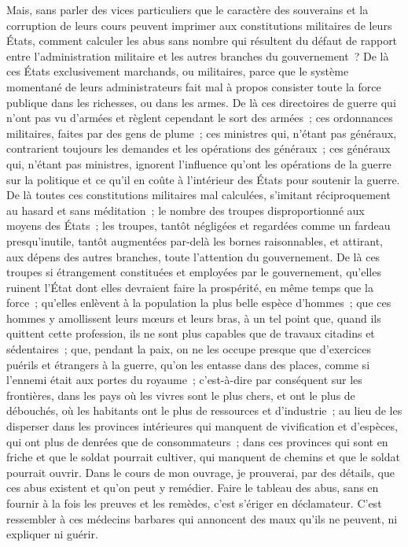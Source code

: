 \documentclass[french,twoside]{book} %
\begin{document}
Mais, sans parler des vices particuliers que le caractère des souverains et la corruption de leurs cours peuvent imprimer aux constitutions militaires de leurs États, comment calculer les abus sans nombre qui résultent du défaut de rapport entre l’administration militaire et les autres branches du gouvernement ? De là ces États exclusivement marchands, ou militaires, parce que le système momentané de leurs administrateurs fait mal à propos consister toute la force publique dans les richesses, ou dans les armes. De là ces directoires de guerre qui n’ont pas vu d’armées et règlent cependant le sort des armées ; ces ordonnances militaires, faites par des gens de plume ; ces ministres qui, n’étant pas généraux, contrarient toujours les demandes et les opérations des généraux ; ces généraux qui, n’étant pas ministres, ignorent l’influence qu’ont les opérations de la guerre sur la politique et ce qu’il en coûte à l’intérieur des États pour soutenir la guerre. De là toutes ces constitutions militaires mal calculées, s’imitant réciproquement au hasard et sans méditation ; le nombre des troupes disproportionné aux moyens des États ; les troupes, tantôt négligées et regardées comme un fardeau presqu’inutile, tantôt augmentées par-delà les bornes raisonnables, et attirant, aux dépens des autres branches, toute l’attention du gouvernement. De là ces troupes si étrangement constituées et employées par le gouvernement, qu’elles ruinent l’État dont elles devraient faire la prospérité, en même temps que la force ; qu’elles enlèvent à la population la plus belle espèce d’hommes ; que ces hommes y amollissent leurs mœurs et leurs bras, à un tel point que, quand ils quittent cette profession, ils ne sont plus capables que de travaux citadins et sédentaires ; que, pendant la paix, on ne les occupe presque que d’exercices puérils et étrangers à la guerre, qu’on les entasse dans des places, comme si l’ennemi était aux portes du royaume ; c’est-à-dire par conséquent sur les frontières, dans les pays où les vivres sont le plus chers, et ont le plus de débouchés, où les habitants ont le plus de ressources et d’industrie ; au lieu de les disperser dans les provinces intérieures qui manquent de vivification et d’espèces, qui ont plus de denrées que de consommateurs ; dans ces provinces qui sont en friche et que le soldat pourrait cultiver, qui manquent de chemins et que le soldat pourrait ouvrir. Dans le cours de mon ouvrage, je prouverai, par des détails, que ces abus existent et qu’on peut y remédier. Faire le tableau des abus, sans en fournir à la fois les preuves et les remèdes, c’est s’ériger en déclamateur. C’est ressembler à ces médecins barbares qui annoncent des maux qu’ils ne peuvent, ni expliquer ni guérir.\par
\end{document}
